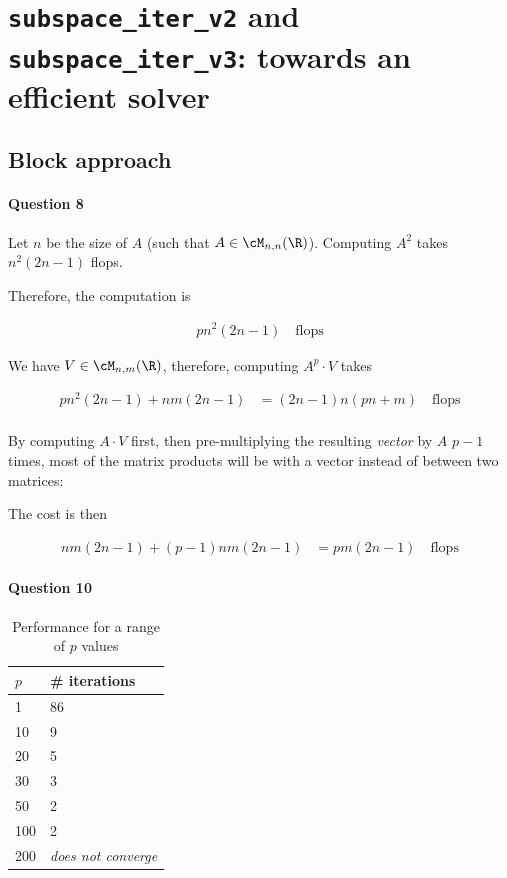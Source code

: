 \documentclass{article}
\begin{document}
\section{\verb|subspace_iter_v2| and \verb|subspace_iter_v3|: towards an efficient solver}

\subsection{Block approach}

\paragraph{Question 8}

Let $n$ be the size of $A$ (such that $A \in \cM_{n, n}(\R)$). Computing $A^2$ takes $n^2(2n-1)$ flops.

Therefore, the computation is

\begin{align*}
	p n^2 (2n-1) \quad \text{flops}
\end{align*}

We have $V \in \cM_{n, m}(\R)$, therefore, computing $A^{p} \cdot V$ takes

\begin{align*}
	pn^2(2n-1) + nm(2n-1) &= (2n-1)n(pn+m) \quad \text{flops} \\
\end{align*}

By computing $A \cdot V$ first, then pre-multiplying the resulting \emph{vector} by $A$ $p-1$ times, most of the matrix products will be with a vector instead of between two matrices:

The cost is then

\begin{align*}
	nm(2n-1) + (p-1)nm(2n-1) &= pm(2n-1)  \quad \text{flops}
\end{align*}



\paragraph{Question 10}

\begin{table}[H]
	\centering
	\caption{Performance for a range of $p$ values}
	\label{tab:perf-p-values}
	\begin{tabular}{l|l}
		$p$ & # iterations \\\hline
		1  & 86   \\
		10 & 9  \\
		20 & 5  \\
		30 & 3  \\
		50 & 2  \\
		100 & 2  \\
		200 & \emph{does not converge} 
	\end{tabular}
\end{table}
\end{document}
